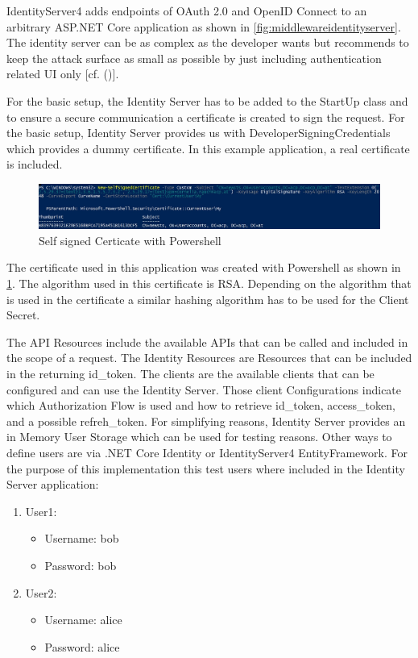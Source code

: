 IdentityServer4 adds endpoints of OAuth 2.0 and OpenID Connect to an arbitrary ASP.NET Core application as shown in \ref{fig:middlewareidentityserver}. The identity server can be as complex as the developer wants but \cite{Brock:2018:ID4} recommends to keep the attack surface as small as possible by just including authentication related UI only [cf. (\cite{Brock:2018:ID4})]. 


For the basic setup, the Identity Server has to be added to the StartUp class and to ensure a secure communication a certificate is created to sign the request. For the basic setup, Identity Server provides us with DeveloperSigningCredentials which provides a dummy certificate. In this example application, a real certificate is included. 

\begin{figure}[h]
	\centering
	\includegraphics[width=0.9\linewidth]{images/self-signed-certicate}
	\caption{Self signed Certicate with Powershell}
	\label{fig:self-signed-certicate}
\end{figure}

The certificate used in this application was created with Powershell as shown in \ref{fig:self-signed-certicate}. The algorithm used in this certificate is RSA. Depending on the algorithm that is used in the certificate a similar hashing algorithm has to be used for the Client Secret.


The API Resources include the available APIs that can be called and included in the scope of a request. The Identity Resources are Resources that can be included in the returning id\_token. The clients are the available clients that can be configured and can use the Identity Server. Those client Configurations indicate which Authorization Flow is used and how to retrieve id\_token, access\_token, and a possible refreh\_token. For simplifying reasons, Identity Server provides an in Memory User Storage which can be used for testing reasons. Other ways to define users are via .NET Core Identity or IdentityServer4 EntityFramework. For the purpose of this implementation this test users where included in the Identity Server application:
\begin{enumerate}
	\item User1:
	\begin{itemize}
		\item  Username: bob
		\item  Password: bob
	\end{itemize} 
	\item User2:
	\begin{itemize}
		\item  Username: alice
		\item  Password: alice
	\end{itemize} 
\end{enumerate}

